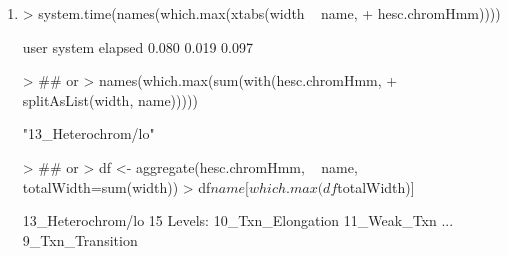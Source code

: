\documentclass[10pt]{article}
\begin{document}
\begin{enumerate}
\begin{Schunk}
\begin{Soutput}
{    ans
}
\end{Soutput}
\begin{Soutput}
Pairs object with 389830 pairs and 0 metadata columns:
                                first                     second
                            <GRanges>                  <GRanges>
       [1]    chr12:9220777-9220778:-    chr12:9220436-9220437:-
       [2]    chr12:9221334-9221335:-    chr12:9220821-9220822:-
       [3]    chr12:9222339-9222340:-    chr12:9221439-9221440:-
       [4]    chr12:9223082-9223083:-    chr12:9222410-9222411:-
       [5]    chr12:9224953-9224954:-    chr12:9223175-9223176:-
       ...                        ...                        ...
  [389826] chr9:123626325-123626326:- chr9:123625028-123625029:-
  [389827] chr9:123627986-123627987:- chr9:123626395-123626396:-
  [389828] chr9:123628304-123628305:- chr9:123628109-123628110:-
  [389829] chr9:123629146-123629147:- chr9:123628375-123628376:-
  [389830] chr9:123631084-123631085:- chr9:123629244-123629245:-
\end{Soutput}
\begin{Sinput}
> ## better way to get introns:
> library(TxDb.Hsapiens.UCSC.hg19.knownGene)
> txdb <- TxDb.Hsapiens.UCSC.hg19.knownGene
> introns <- unlist(intronsByTranscript(txdb))
\end{Sinput}
\end{Schunk}
\item
\begin{Schunk}
\begin{Sinput}
> system.time(names(which.max(xtabs(width ~ name, 
+                                   hesc.chromHmm))))
\end{Sinput}
\begin{Soutput}
   user  system elapsed 
  0.080   0.019   0.097 
\end{Soutput}
\begin{Sinput}
> ## or
> names(which.max(sum(with(hesc.chromHmm, 
+                          splitAsList(width, name)))))
\end{Sinput}
\begin{Soutput}
[1] "13_Heterochrom/lo"
\end{Soutput}
\begin{Sinput}
> ## or
> df <- aggregate(hesc.chromHmm, ~ name, totalWidth=sum(width))
> df$name[which.max(df$totalWidth)]
\end{Sinput}
\begin{Soutput}
[1] 13_Heterochrom/lo
15 Levels: 10_Txn_Elongation 11_Weak_Txn ... 9_Txn_Transition
\end{Soutput}
\end{Schunk}
\end{enumerate}



\end{document}
